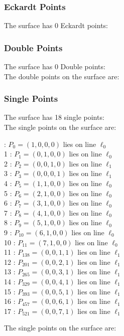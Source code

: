 \documentclass{article}
\begin{document}
{\subsubsection*{Eckardt Points}
The surface has 0 Eckardt points:\\
\subsubsection*{Double Points}
The surface has 0 Double points:\\
The double points on the surface are:\\
\begin{multicols}{2}
\noindent
\end{multicols}
\subsubsection*{Single Points}
The surface has 18 single points:\\
The single points on the surface are:\\
\begin{multicols}{2}
 : $P_{0}=( 1, 0, 0, 0 )$ lies on line $\ell_{0}$\\
1 : $P_{1}=( 0, 1, 0, 0 )$ lies on line $\ell_{0}$\\
2 : $P_{2}=( 0, 0, 1, 0 )$ lies on line $\ell_{1}$\\
3 : $P_{3}=( 0, 0, 0, 1 )$ lies on line $\ell_{1}$\\
4 : $P_{5}=( 1, 1, 0, 0 )$ lies on line $\ell_{0}$\\
5 : $P_{6}=( 2, 1, 0, 0 )$ lies on line $\ell_{0}$\\
6 : $P_{7}=( 3, 1, 0, 0 )$ lies on line $\ell_{0}$\\
7 : $P_{8}=( 4, 1, 0, 0 )$ lies on line $\ell_{0}$\\
8 : $P_{9}=( 5, 1, 0, 0 )$ lies on line $\ell_{0}$\\
9 : $P_{10}=( 6, 1, 0, 0 )$ lies on line $\ell_{0}$\\
10 : $P_{11}=( 7, 1, 0, 0 )$ lies on line $\ell_{0}$\\
11 : $P_{138}=( 0, 0, 1, 1 )$ lies on line $\ell_{1}$\\
12 : $P_{201}=( 0, 0, 2, 1 )$ lies on line $\ell_{1}$\\
13 : $P_{265}=( 0, 0, 3, 1 )$ lies on line $\ell_{1}$\\
14 : $P_{329}=( 0, 0, 4, 1 )$ lies on line $\ell_{1}$\\
15 : $P_{393}=( 0, 0, 5, 1 )$ lies on line $\ell_{1}$\\
16 : $P_{457}=( 0, 0, 6, 1 )$ lies on line $\ell_{1}$\\
17 : $P_{521}=( 0, 0, 7, 1 )$ lies on line $\ell_{1}$\\
\end{multicols}
The single points on the surface are:\\
}
\end{document}
